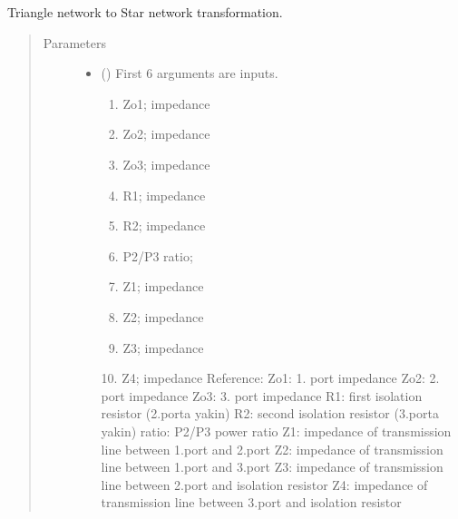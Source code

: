 \documentclass[letterpaper,10pt,english]{sphinxmanual}
\begin{document}

\begin{fulllineitems}
\label{\detokenize{components:components.GyselPowerDivider}}
Triangle network to Star network transformation.
\begin{quote}\begin{description}
\item[{Parameters}] \leavevmode\begin{itemize}
\item {} 
 () \textendash{} 
First 6 arguments are inputs.
\begin{enumerate}
%
\item {} 
Zo1;  impedance

\item {} 
Zo2;  impedance

\item {} 
Zo3;  impedance

\item {} 
R1; impedance

\item {} 
R2; impedance

\item {} 
P2/P3 ratio;

\item {} 
Z1; impedance

\item {} 
Z2; impedance

\item {} 
Z3; impedance

\end{enumerate}

10. Z4; impedance
Reference:
Zo1: 1. port impedance
Zo2: 2. port impedance
Zo3: 3. port impedance
R1: first isolation resistor (2.porta yakin)
R2: second isolation resistor (3.porta yakin)
ratio: P2/P3 power ratio
Z1: impedance of transmission line between 1.port and 2.port
Z2: impedance of transmission line between 1.port and 3.port
Z3: impedance of transmission line between 2.port and isolation resistor
Z4: impedance of transmission line between 3.port and isolation resistor



\end{itemize}
\end{description}
\end{quote}
\end{fulllineitems}
\end{document}
